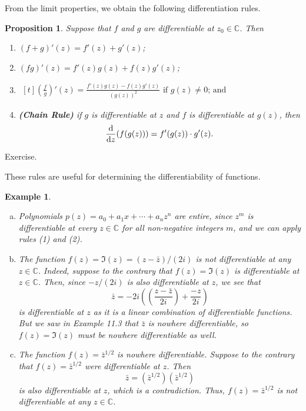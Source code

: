 \documentclass[10pt]{article}
\makeatletter
\newcommand{\C}{\mathbb{C}}
\theoremstyle{newstyle}
\newtheorem{prop}[thm]{Proposition}
\newtheorem{exmp}[thm]{Example}
\newenvironment{pf}[1][\proofname]{\par
  \pushQED{\qed}%
  \normalfont \topsep0\p@\relax
  \trivlist
  \item[\hskip\labelsep\scshape
  #1\@addpunct{.}]\ignorespaces
}{%
  \popQED\endtrivlist\@endpefalse
}
\makeatother
\begin{document}
From the limit properties, we obtain the following differentiation rules. 

\begin{prop}
Suppose that $f$ and $g$ are differentiable at $z_0 \in \C$. Then
\begin{enumerate}[(1)]
    \item $(f+g)'(z) = f'(z) + g'(z)$;
    \item $(fg)'(z) = f'(z) g(z) + f(z) g'(z)$;
    \item $\begin{aligned}[t] \left(\frac{f}{g}\right)'(z) = 
    \frac{f'(z)g(z) - f(z)g'(z)}{(g(z))^2} \text{ if $g(z) \neq 0$; and} \end{aligned}$
    \item {\bf (Chain Rule)} if $g$ is differentiable at $z$ and $f$ is differentiable at $g(z)$, then 
    \[ \frac{\rm d}{{\rm d}z} (f(g(z))) = f'(g(z)) \cdot g'(z). \]
\end{enumerate}
\end{prop}
\begin{pf}
Exercise. 
\end{pf}

These rules are useful for determining the differentiability of functions. 

\begin{exmp}~
\begin{enumerate}[(a)]
    \item Polynomials $p(z) = a_0 + a_1x + \cdots + a_n z^n$ are entire, since 
    $z^m$ is differentiable at every $z \in \C$ for all non-negative integers $m$, 
    and we can apply rules (1) and (2). 
    \item The function $f(z) = \Im(z) = (z-\bar{z})/(2i)$ is not differentiable at any $z \in \C$. 
    Indeed, suppose to the contrary that $f(z) = \Im(z)$ is differentiable at $z \in \C$. 
    Then, since $-z/(2i)$ is also differentiable at $z$, we see that 
    \[ \bar{z} = -2i \left( \left( \frac{z-\bar{z}}{2i} \right) + \frac{-z}{2i} \right) \]
    is differentiable at $z$ as it is a linear combination of differentiable functions. 
    But we saw in Example 11.3 that $\bar{z}$ is nowhere differentiable, so 
    $f(z) = \Im(z)$ must be nowhere differentiable as well.
    \item The function $f(z) = \bar{z}^{1/2}$ is nowhere differentiable. Suppose 
    to the contrary that $f(z) = 
    \bar{z}^{1/2}$ were differentiable at $z$. Then 
    \[ \bar{z} = (\bar{z}^{1/2})(\bar{z}^{1/2}) \]
    is also differentiable at $z$, which is a contradiction. Thus, $f(z) = \bar{z}^{1/2}$ is not 
    differentiable at any $z \in \C$.
\end{enumerate}
\end{exmp}
\end{document}
